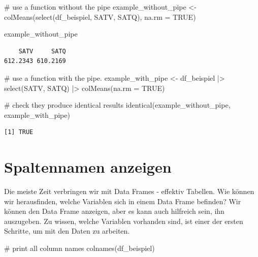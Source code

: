 \documentclass[
  letterpaper,
  DIV=11,
  numbers=noendperiod]{scrreprt}
\newenvironment{Shaded}{\begin{snugshade}}{\end{snugshade}}
\newcommand{\AttributeTok}[1]{\textcolor[rgb]{0.40,0.45,0.13}{#1}}
\newcommand{\CommentTok}[1]{\textcolor[rgb]{0.37,0.37,0.37}{#1}}
\newcommand{\ConstantTok}[1]{\textcolor[rgb]{0.56,0.35,0.01}{#1}}
\newcommand{\FunctionTok}[1]{\textcolor[rgb]{0.28,0.35,0.67}{#1}}
\newcommand{\NormalTok}[1]{\textcolor[rgb]{0.00,0.23,0.31}{#1}}
\newcommand{\OtherTok}[1]{\textcolor[rgb]{0.00,0.23,0.31}{#1}}
\newcommand{\SpecialCharTok}[1]{\textcolor[rgb]{0.37,0.37,0.37}{#1}}
\begin{document}
\begin{Shaded}
\begin{Highlighting}[]
\CommentTok{\# use a function without the pipe}
\NormalTok{example\_without\_pipe }\OtherTok{\textless{}{-}} \FunctionTok{colMeans}\NormalTok{(}\FunctionTok{select}\NormalTok{(df\_beispiel, SATV, SATQ), }\AttributeTok{na.rm =} \ConstantTok{TRUE}\NormalTok{)}

\NormalTok{example\_without\_pipe}
\end{Highlighting}
\end{Shaded}

\begin{verbatim}
    SATV     SATQ 
612.2343 610.2169 
\end{verbatim}

\begin{Shaded}
\begin{Highlighting}[]
\CommentTok{\# use a function with the pipe. }
\NormalTok{example\_with\_pipe }\OtherTok{\textless{}{-}}\NormalTok{ df\_beispiel }\SpecialCharTok{|\textgreater{}} 
  \FunctionTok{select}\NormalTok{(SATV, SATQ) }\SpecialCharTok{|\textgreater{}} 
  \FunctionTok{colMeans}\NormalTok{(}\AttributeTok{na.rm =} \ConstantTok{TRUE}\NormalTok{)}

\CommentTok{\# check they produce identical results}
\FunctionTok{identical}\NormalTok{(example\_without\_pipe, example\_with\_pipe)}
\end{Highlighting}
\end{Shaded}

\begin{verbatim}
[1] TRUE
\end{verbatim}

\section{Spaltennamen anzeigen}\label{spaltennamen-anzeigen}

Die meiste Zeit verbringen wir mit Data Frames - effektiv Tabellen. Wie
können wir herausfinden, welche Variablen sich in einem Data Frame
befinden? Wir können den Data Frame anzeigen, aber es kann auch
hilfreich sein, ihn auszugeben. Zu wissen, welche Variablen vorhanden
sind, ist einer der ersten Schritte, um mit den Daten zu arbeiten.

\begin{Shaded}
\begin{Highlighting}[]
\CommentTok{\# print all column names}
\FunctionTok{colnames}\NormalTok{(df\_beispiel)}
\end{Highlighting}
\end{Shaded}
\end{document}
